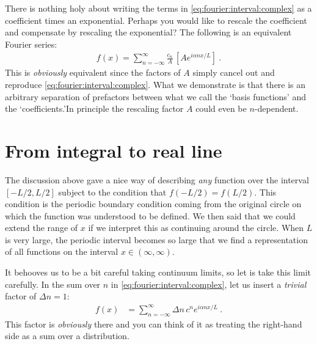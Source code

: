 \begin{example}\label{ex:Fourier:prefactor:convention}
There is nothing holy about writing the terms in \eqref{eq:fourier:interval:complex} as a coefficient times an exponential. Perhaps you would like to rescale the coefficient and compensate by rescaling the exponential? The following is an equivalent Fourier series:
\begin{align}
    f(x) = \sum_{n=-\infty}^\infty 
    \frac{c_n}{A} \, \left[A e^{i\alpha n x/L} \right] \ .
\end{align}
This is \emph{obviously} equivalent since the factors of $A$ simply cancel out and reproduce \eqref{eq:fourier:interval:complex}. What we demonstrate is that there is an arbitrary separation of prefactors between what we call the `basis functions' and the `coefficients.'\sidenotemark  In principle the rescaling factor $A$ could even be $n$-dependent. 
\end{example}


\section{From integral to real line}
The discussion above gave a nice way of describing \emph{any} function over the interval $[-L/2, L/2]$ subject to the condition that $f(-L/2) = f(L/2)$. This condition is the periodic boundary condition coming from the original circle on which the function was understood to be defined. We then said that we could extend the range of $x$ if we interpret this as continuing around the circle. When $L$ is very large, the periodic interval becomes so large that we find a representation of all functions on the interval $x\in (\infty, \infty)$. 

It behooves us to be a bit careful taking continuum limits, so let is take this limit carefully. In the sum over $n$ in \eqref{eq:fourier:interval:complex}, let us insert a \emph{trivial} factor of $\Delta n = 1$:
\begin{align}
    f(x) &= \sum_{n=-\infty}^\infty \Delta n\, c^n e^{i\alpha n x/L} \ .
    \label{eq:toward:fourier:transform:discrete:sum}
\end{align}
This factor is \emph{obviously} there and you can think of it as treating the right-hand side as a sum over a distribution. 

